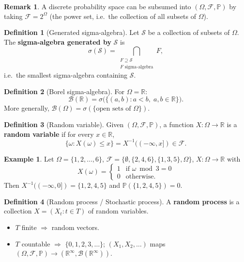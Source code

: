 \documentclass[12pt, a4paper]{article}
\theoremstyle{definition}
\newtheorem{definition}{Definition}[section]
\newtheorem{example}{Example}[section]
\newtheorem{remark}{Remark}[section]
\theoremstyle{plain}
\newcommand{\PP}{\mathbb{P}}
\newcommand{\FF}{\mathcal{F}}
\newcommand{\RR}{\mathbb{R}}
\begin{document}
\begin{remark}
A discrete probability space can be subsumed into $(\Omega, \FF, \PP)$ by taking $\FF = 2^\Omega$ (the power set, i.e.\ the collection of all subsets of $\Omega$).
\end{remark}

\begin{definition}[Generated sigma-algebra]
Let $\mathcal{S}$ be a collection of subsets of $\Omega$. The \textbf{sigma-algebra generated by} $\mathcal{S}$ is
\begin{equation*}
  \sigma(\mathcal{S}) = \bigcap_{\substack{F \supseteq \mathcal{S} \\ F \text{ sigma-algebra}}} F,
\end{equation*}
i.e.\ the smallest sigma-algebra containing $\mathcal{S}$.
\end{definition}

\begin{definition}[Borel sigma-algebra]
For $\Omega = \RR$:
\begin{equation*}
  \mathcal{B}(\RR) = \sigma\bigl(\{(a,b) : a < b,\; a,b \in \RR\}\bigr).
\end{equation*}
More generally, $\mathcal{B}(\Omega) = \sigma(\{\text{open sets of } \Omega\})$.
\end{definition}

\begin{definition}[Random variable]
Given $(\Omega, \FF, \PP)$, a function $X : \Omega \to \RR$ is a \textbf{random variable} if for every $x \in \RR$,
\begin{equation*}
  \{\omega : X(\omega) \le x\} = X^{-1}((-\infty, x]) \in \FF.
\end{equation*}
\end{definition}

\begin{example}
Let $\Omega = \{1,2,\ldots,6\}$, $\FF = \{\emptyset, \{2,4,6\}, \{1,3,5\}, \Omega\}$, $X : \Omega \to \RR$ with
\begin{equation*}
  X(\omega) = \begin{cases} 1 & \text{if } \omega \bmod 3 = 0 \\ 0 & \text{otherwise.} \end{cases}
\end{equation*}
Then $X^{-1}((-\infty, 0]) = \{1,2,4,5\}$ and $\PP(\{1,2,4,5\}) = 0$.
\end{example}

\begin{definition}[Random process / Stochastic process]
A \textbf{random process} is a collection $X = (X_t : t \in T)$ of random variables.
\begin{itemize}
  \item $T$ finite $\Rightarrow$ random vectors.
  \item $T$ countable $\Rightarrow$ $\{0,1,2,3,\ldots\}$; $(X_1, X_2, \ldots)$ maps $(\Omega, \FF, \PP) \to (\RR^\infty, \mathcal{B}(\RR^\infty))$.
\end{itemize}
\end{definition}
\end{document}
